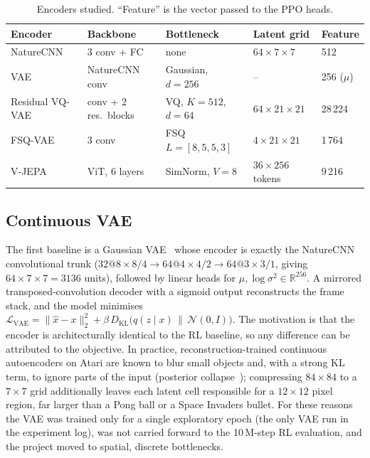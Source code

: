 \documentclass[runningheads]{llncs}
\newcommand{\R}{\mathbb{R}}
\begin{document}
\begin{table}[t]
\centering
\caption{Encoders studied. ``Feature'' is the vector passed to the PPO heads.}
\label{tab:encoders}
\footnotesize\setlength{\tabcolsep}{3pt}
\begin{tabular}{@{}lllll@{}}
\toprule
Encoder & Backbone & Bottleneck & Latent grid & Feature \\
\midrule
NatureCNN~\cite{mnih2015human} & 3 conv + FC & none & $64\times7\times7$ & 512 \\
VAE & NatureCNN conv & Gaussian, $d=256$ & -- & 256 ($\mu$) \\
Residual VQ-VAE & conv + 2 res.\ blocks & VQ, $K=512$, $d=64$ & $64\times21\times21$ & 28\,224 \\
FSQ-VAE & 3 conv & FSQ $L=[8,5,5,3]$ & $4\times21\times21$ & 1\,764 \\
V-JEPA & ViT, 6 layers & SimNorm, $V=8$ & $36\times256$ tokens & 9\,216 \\
\bottomrule
\end{tabular}
\end{table}

\subsection{Continuous VAE}
\label{sec:vae}

The first baseline is a Gaussian VAE~\cite{kingma2014vae} whose encoder is exactly the
NatureCNN convolutional trunk ($32@8{\times}8/4 \rightarrow 64@4{\times}4/2 \rightarrow
64@3{\times}3/1$, giving $64\times7\times7=3136$ units), followed by linear heads for
$\mu,\log\sigma^2\in\R^{256}$. A mirrored transposed-convolution decoder with a sigmoid
output reconstructs the frame stack, and the model minimises
$\mathcal{L}_{\text{VAE}}=\|\hat x-x\|_2^2+\beta\,D_{\text{KL}}\big(q(z\mid x)\,\|\,\mathcal{N}(0,I)\big)$.
The motivation is that the encoder is architecturally identical to the RL baseline, so any
difference can be attributed to the objective. In practice, reconstruction-trained
continuous autoencoders on Atari are known to blur small objects and, with a strong KL
term, to ignore parts of the input (posterior
collapse~\cite{bowman2016posterior}); compressing $84\times84$ to a $7\times7$ grid
additionally leaves each latent cell responsible for a $12\times12$ pixel region, far larger
than a Pong ball or a Space Invaders bullet. For these reasons the VAE was trained only
for a single exploratory epoch (the only VAE run in the experiment log), was not carried
forward to the 10\,M-step RL evaluation, and the project moved to spatial, discrete
bottlenecks.
\end{document}
